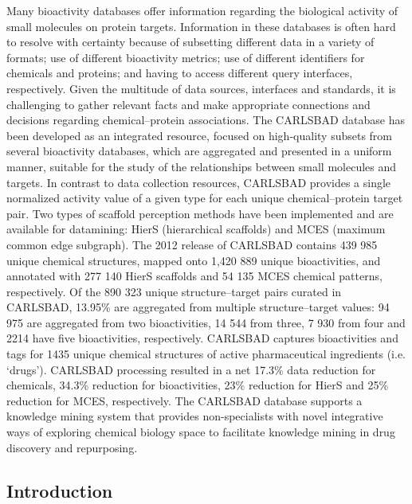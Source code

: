 Many bioactivity databases offer information regarding the biological activity of small molecules on protein targets. Information in these databases is often hard to resolve with certainty because of subsetting different data in a variety of formats; use of different bioactivity metrics; use of different identifiers for chemicals and proteins; and having to access different query interfaces, respectively. Given the multitude of data sources, interfaces and standards, it is challenging to gather relevant facts and make appropriate connections and decisions regarding chemical–protein associations. The CARLSBAD database has been developed as an integrated resource, focused on high-quality subsets from several bioactivity databases, which are aggregated and presented in a uniform manner, suitable for the study of the relationships between small molecules and targets. In contrast to data collection resources, CARLSBAD provides a single normalized activity value of a given type for each unique chemical–protein target pair. Two types of scaffold perception methods have been implemented and are available for datamining: HierS (hierarchical scaffolds) and MCES (maximum common edge subgraph). The 2012 release of CARLSBAD contains 439 985 unique chemical structures, mapped onto 1,420 889 unique bioactivities, and annotated with 277 140 HierS scaffolds and 54 135 MCES chemical patterns, respectively. Of the 890 323 unique structure–target pairs curated in CARLSBAD, 13.95\% are aggregated from multiple structure–target values: 94 975 are aggregated from two bioactivities, 14 544 from three, 7 930 from four and 2214 have five bioactivities, respectively. CARLSBAD captures bioactivities and tags for 1435 unique chemical structures of active pharmaceutical ingredients (i.e. ‘drugs’). CARLSBAD processing resulted in a net 17.3\% data reduction for chemicals, 34.3\% reduction for bioactivities, 23\% reduction for HierS and 25\% reduction for MCES, respectively. The CARLSBAD database supports a knowledge mining system that provides non-specialists with novel integrative ways of exploring chemical biology space to facilitate knowledge mining in drug discovery and repurposing.

\subsection{Introduction}

